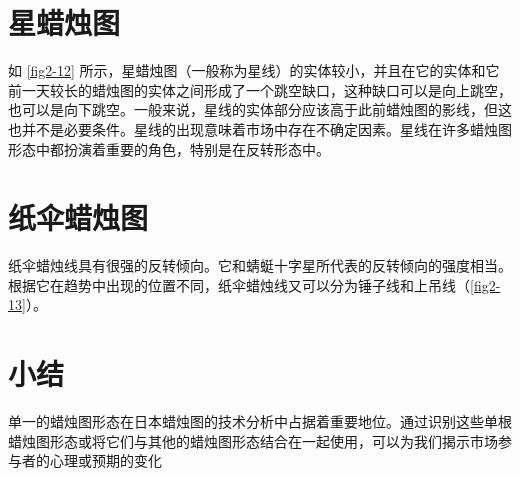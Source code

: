 \section{星蜡烛图}
如 \autoref{fig2-12} 所示，星蜡烛图（一般称为星线）的实体较小，并且在它的实体和它前一天较长的蜡烛图的实体之间形成了一个跳空缺口，这种缺口可以是向上跳空，也可以是向下跳空。一般来说，星线的实体部分应该高于此前蜡烛图的影线，但这也并不是必要条件。星线的出现意味着市场中存在不确定因素。星线在许多蜡烛图形态中都扮演着重要的角色，特别是在反转形态中。
\section{纸伞蜡烛图}
纸伞蜡烛线具有很强的反转倾向。它和蜻蜓十字星所代表的反转倾向的强度相当。根据它在趋势中出现的位置不同，纸伞蜡烛线又可以分为锤子线和上吊线（\autoref{fig2-13}）。
\section{小结}
单一的蜡烛图形态在日本蜡烛图的技术分析中占据着重要地位。通过识别这些单根蜡烛图形态或将它们与其他的蜡烛图形态结合在一起使用，可以为我们揭示市场参与者的心理或预期的变化